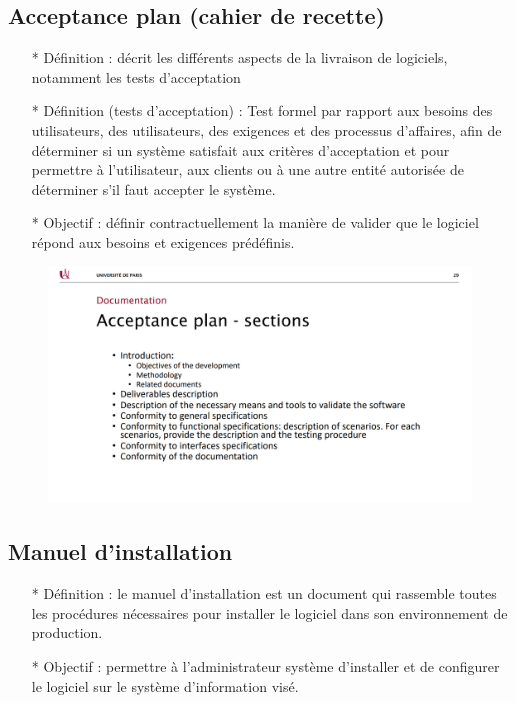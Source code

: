 \documentclass[12pt]{article}
\begin{document}
\subsection{Acceptance plan (cahier de recette)}
\begin{itemize}
	\item[* ] Définition : décrit les différents aspects de la livraison de logiciels, notamment
	les tests d'acceptation
	\item[* ] Définition (tests d'acceptation) : Test formel par rapport aux besoins des utilisateurs,
	des utilisateurs, des exigences et des processus d'affaires, afin de déterminer si un
	système satisfait aux critères d'acceptation et pour permettre à l'utilisateur, aux clients ou à une autre entité autorisée de déterminer s'il faut accepter le système.
	\item[* ] Objectif : définir contractuellement la manière de valider que le logiciel répond aux besoins et exigences prédéfinis.
\end{itemize}
\newpage
	\begin{figure}[!hbtp]
	\centering
	\includegraphics[scale=0.75]{Capture7.PNG}
\end{figure}
\subsection{Manuel d'installation}
\begin{itemize}
	\item[* ] Définition : le manuel d'installation est un document qui rassemble toutes les
	procédures nécessaires pour installer le logiciel dans son environnement de production.
	\item[* ] Objectif : permettre à l'administrateur système d'installer et de configurer le logiciel sur le système d'information visé.
\end{itemize}
\end{document}
